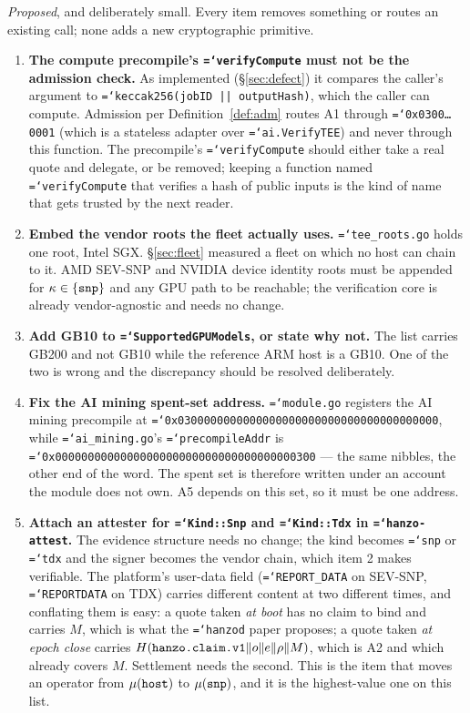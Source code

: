 \documentclass[11pt,a4paper]{article}
\newcommand{\code}[1]{\texttt{\hyphenchar\font=`\-\relax #1}}
\begin{document}
\emph{Proposed}, and deliberately small. Every item removes something or routes
an existing call; none adds a new cryptographic primitive.

\begin{enumerate}[leftmargin=1.8em]
  \item \textbf{The compute precompile's \code{verifyCompute} must not be the
    admission check.} As implemented (§\ref{sec:defect}) it compares the caller's
    argument to \code{keccak256(jobID || outputHash)}, which the caller can
    compute. Admission per Definition~\ref{def:adm} routes A1 through
    \code{0x0300\ldots0001} (which is a stateless adapter over
    \code{ai.VerifyTEE}) and never through this function. The precompile's
    \code{verifyCompute} should either take a real quote and delegate, or be
    removed; keeping a function named \code{verifyCompute} that verifies a hash
    of public inputs is the kind of name that gets trusted by the next reader.

  \item \textbf{Embed the vendor roots the fleet actually uses.}
    \code{tee\_roots.go} holds one root, Intel SGX. §\ref{sec:fleet} measured a
    fleet on which no host can chain to it. AMD SEV-SNP and NVIDIA device
    identity roots must be appended for $\kappa \in \{\code{snp}\}$ and any GPU
    path to be reachable; the verification core is already vendor-agnostic and
    needs no change.

  \item \textbf{Add GB10 to \code{SupportedGPUModels}, or state why not.} The
    list carries GB200 and not GB10 while the reference ARM host is a GB10. One
    of the two is wrong and the discrepancy should be resolved deliberately.

  \item \textbf{Fix the AI mining spent-set address.} \code{module.go} registers
    the AI mining precompile at
    \code{0x0300000000000000000000000000000000000000}, while
    \code{ai\_mining.go}'s \code{precompileAddr} is
    \code{0x0000000000000000000000000000000000000300} --- the same nibbles, the
    other end of the word. The spent set is therefore written under an account
    the module does not own. A5 depends on this set, so it must be one address.

  \item \textbf{Attach an attester for \code{Kind::Snp} and \code{Kind::Tdx} in
    \code{hanzo-attest}.} The evidence structure needs no change; the kind becomes
    \code{snp} or \code{tdx} and the signer becomes the vendor chain, which item 2
    makes verifiable. The platform's user-data field (\code{REPORT\_DATA} on
    SEV-SNP, \code{REPORTDATA} on TDX) carries different content at two different
    times, and conflating them is easy: a quote taken \emph{at boot} has no claim
    to bind and carries $M$, which is what the \code{hanzod} paper proposes; a
    quote taken \emph{at epoch close} carries
    $H(\code{hanzo.claim.v1}\|o\|e\|\rho\|M)$, which is A2 and which already
    covers $M$. Settlement needs the second. This is the item that moves an
    operator from $\mu(\code{host})$ to $\mu(\code{snp})$, and it is the
    highest-value one on this list.


\end{enumerate}
\end{document}
